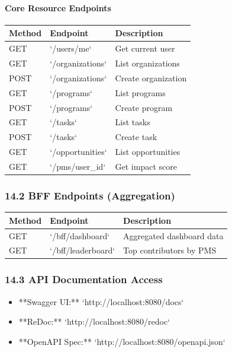 \documentclass[11pt,a4paper]{article}
\begin{document}
\paragraph{Core Resource Endpoints}

\begin{table}[H]
\centering
\begin{tabular}{|l|l|l|}
\hline
Method & Endpoint & Description \\
\hline
GET & `/users/me` & Get current user \\
\hline
GET & `/organizations` & List organizations \\
\hline
POST & `/organizations` & Create organization \\
\hline
GET & `/programs` & List programs \\
\hline
POST & `/programs` & Create program \\
\hline
GET & `/tasks` & List tasks \\
\hline
POST & `/tasks` & Create task \\
\hline
GET & `/opportunities` & List opportunities \\
\hline
GET & `/pms/{user_id}` & Get impact score \\
\hline
\end{tabular}
\end{table}

\subsubsection{14.2 BFF Endpoints (Aggregation)}

\begin{table}[H]
\centering
\begin{tabular}{|l|l|l|}
\hline
Method & Endpoint & Description \\
\hline
GET & `/bff/dashboard` & Aggregated dashboard data \\
\hline
GET & `/bff/leaderboard` & Top contributors by PMS \\
\hline
\end{tabular}
\end{table}

\subsubsection{14.3 API Documentation Access}

\begin{itemize}
\item **Swagger UI:** `http://localhost:8080/docs`
\item **ReDoc:** `http://localhost:8080/redoc`
\item **OpenAPI Spec:** `http://localhost:8080/openapi.json`
\end{itemize}
\end{document}
